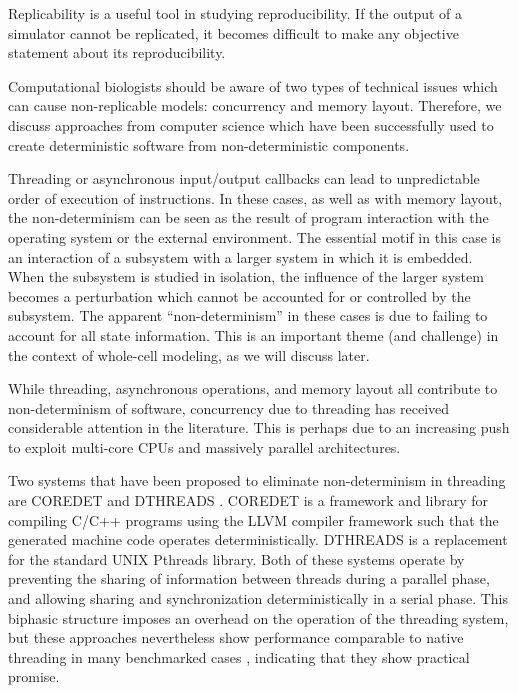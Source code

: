 \documentclass[journal,transmag,twoside]{IEEEtran}
\begin{document}
Replicability is a useful tool in studying reproducibility.
If the output of a simulator cannot be replicated, it becomes
difficult to make any objective statement about its reproducibility.

Computational biologists should be aware of two types of technical issues which 
can cause non-replicable models: concurrency and memory layout. 
Therefore, we discuss approaches from computer science which
have been successfully used to create deterministic software from non-deterministic components.

Threading or
asynchronous input/output callbacks can lead to unpredictable
order of execution of instructions.
In these cases, as well as with memory layout,
the non-determinism
can be seen as the result
of program interaction with the operating system or the external environment.
The essential motif in this case is an interaction of a subsystem
with a larger system in which it is embedded.
When the subsystem is studied in isolation, the influence of the larger
system becomes a perturbation which cannot be accounted for or controlled by
the subsystem. The apparent ``non-determinism'' in these cases
is due to failing to account for all state information.
This is an important theme (and challenge) in the context of whole-cell modeling,
as we will discuss later. %

While threading, asynchronous operations, and memory layout all contribute
to non-determinism of software,
concurrency due to threading has received considerable attention in the literature.
This is perhaps due to an increasing push to exploit multi-core CPUs
and massively parallel architectures.

Two systems that have been proposed to eliminate non-determinism in threading
are C{\small ORE}D{\small ET} \cite{bergan2010coredet} and D{\small THREADS} \cite{liu2011dthreads}.
C{\small ORE}D{\small ET} is a framework and library for compiling C/C++ programs
using the LLVM compiler framework such that the generated machine code operates deterministically.
D{\small THREADS} is a replacement for the standard UNIX Pthreads library.
Both of these systems operate by preventing the sharing of information between
threads during a parallel phase, and allowing sharing and synchronization
deterministically in a serial phase.
This biphasic structure imposes an overhead on the operation of the threading
system, but these approaches nevertheless show performance comparable to native
threading in many benchmarked cases \cite{liu2011dthreads}, indicating that they show
practical promise.
\end{document}
